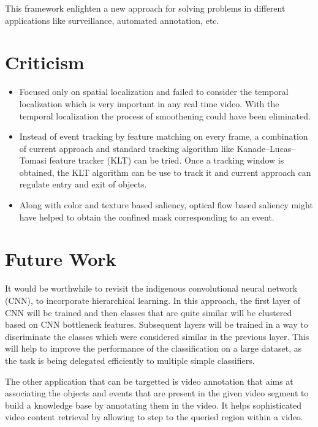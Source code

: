 \par This framework enlighten a new approach for solving problems in different applications like surveillance, automated annotation, etc.

\section{Criticism}
\begin{itemize}
	\item{Focused only on spatial localization and failed to consider the temporal localization which is very important in any real time video.  With the temporal localization the process of smoothening could have been eliminated.}
	\item{Instead of event tracking by feature matching on every frame, a combination of current approach and standard tracking algorithm like Kanade–Lucas–Tomasi feature tracker (KLT) can be tried.  Once a tracking window is obtained, the KLT algorithm can be use to track it and current approach can regulate entry and exit of objects.}
	\item{Along with color and texture based saliency, optical flow based saliency might have helped to obtain the confined mask corresponding to an event.}
\end{itemize}
\clearpage 
\section{Future Work}
It would be worthwhile to revisit the indigenous convolutional neural network (CNN), to incorporate hierarchical learning.  In this approach, the first layer of CNN will be trained and then classes that are quite similar will be clustered based on CNN bottleneck features.  Subsequent layers will be trained in a way to discriminate the classes which were considered similar in the previous layer.  This will help to improve the performance of the classification on a large dataset, as the task is being delegated efficiently to multiple simple classifiers.
\par The other application that can be targetted is video annotation that aims at associating the objects and events that are present in the given video segment to build a knowledge base by annotating them in the video.  It helps sophisticated video content retrieval by allowing to step to the queried region within a video.